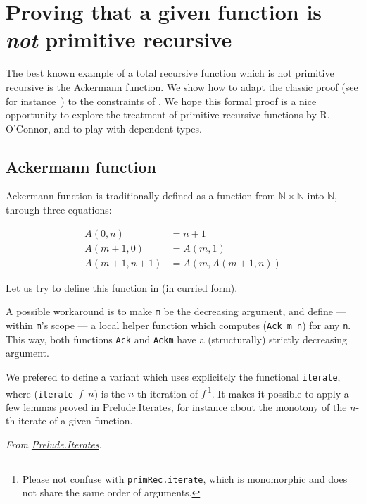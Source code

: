 \section{Proving that a given function is \emph{not} primitive recursive}
\label{sect:ack-not-PR}

The best known example of a total recursive function which is not primitive recursive is the Ackermann function. We show how to adapt the classic proof (see for instance~\cite{planetmath}) to the constraints of \gallina. We hope this formal proof 
 is a nice opportunity to explore
the treatment of primitive recursive functions by R. O'Connor,
and to play with dependent types.

\subsection{Ackermann function}

Ackermann function is traditionally defined as a function from 
$\mathbb{N}\times \mathbb{N}$ into $\mathbb{N}$, through
three equations:

\begin{align}
A(0,n)&=n+1\\
A(m+1,0)&=A(m,1)\\
A(m+1,n+1)&=A(m,A(m+1,n))
\end{align}

Let us try to define this function in \coq{} (in curried form).



A possible workaround is to make \texttt{m} be the 
decreasing argument, and define --- within \texttt{m}'s scope --- a local helper function which computes (\texttt{Ack m n}) for any \texttt{n}.
This way, both functions \texttt{Ack} and \texttt{Ackm} have a (structurally) strictly decreasing argument.



We prefered to define a variant which uses explicitely 
 the functional \texttt{iterate},
where (\texttt{iterate\,$f$\,$n$})
is the $n$-th iteration of $f$\,\footnote{Please not confuse with \texttt{primRec.iterate}, which is monomorphic and does not share the same order of arguments.}. It makes it possible to apply a few lemmas proved in 
\href{../theories/html/hydras.Prelude.Iterates.html}{Prelude.Iterates}, for instance about the monotony of the $n$-th iterate of a given function. 


\vspace{4pt}
\noindent
\emph{From \href{../theories/html/hydras.Prelude.Iterates.html}{Prelude.Iterates}}.

